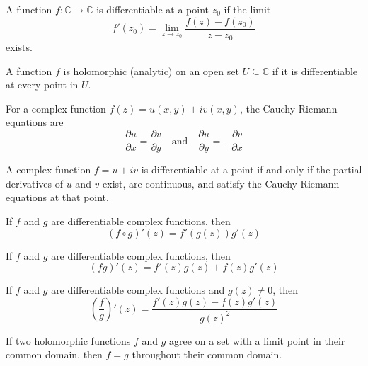 \begin{definition}
A function $f: \mathbb{C} \to \mathbb{C}$ is differentiable at a point $z_0$ if the limit
\[ f'(z_0) = \lim_{z \to z_0} \frac{f(z) - f(z_0)}{z - z_0} \]
exists.
\end{definition}

\begin{definition}
A function $f$ is holomorphic (analytic) on an open set $U \subseteq \mathbb{C}$ if it is differentiable at every point in $U$.
\end{definition}

\begin{definition}
For a complex function $f(z) = u(x,y) + iv(x,y)$, the Cauchy-Riemann equations are
\[ \frac{\partial u}{\partial x} = \frac{\partial v}{\partial y} \quad \text{and} \quad \frac{\partial u}{\partial y} = -\frac{\partial v}{\partial x} \]
\end{definition}

\begin{theorem}
A complex function $f = u + iv$ is differentiable at a point if and only if the partial derivatives of $u$ and $v$ exist, are continuous, and satisfy the Cauchy-Riemann equations at that point.
\end{theorem}

\begin{theorem}
If $f$ and $g$ are differentiable complex functions, then
\[ (f \circ g)'(z) = f'(g(z))g'(z) \]
\end{theorem}

\begin{theorem}
If $f$ and $g$ are differentiable complex functions, then
\[ (fg)'(z) = f'(z)g(z) + f(z)g'(z) \]
\end{theorem}

\begin{theorem}
If $f$ and $g$ are differentiable complex functions and $g(z) \neq 0$, then
\[ \left(\frac{f}{g}\right)'(z) = \frac{f'(z)g(z) - f(z)g'(z)}{g(z)^2} \]
\end{theorem}

\begin{theorem}
If two holomorphic functions $f$ and $g$ agree on a set with a limit point in their common domain, then $f = g$ throughout their common domain.
\end{theorem}

